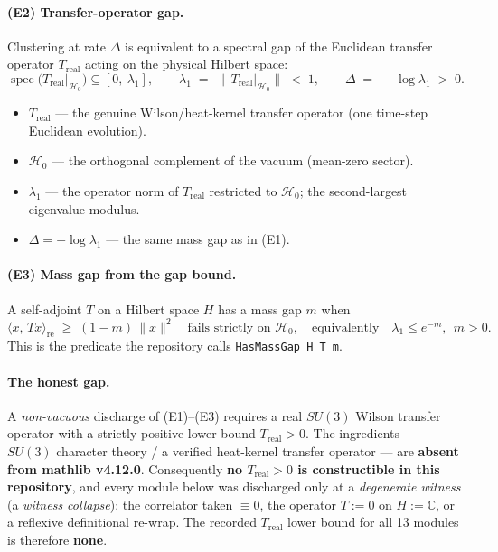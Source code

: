 \documentclass[11pt]{article}
\begin{document}
\paragraph{(E2) Transfer-operator gap.}
Clustering at rate $\Delta$ is equivalent to a spectral gap of the Euclidean
transfer operator $T_{\mathrm{real}}$ acting on the physical Hilbert space:
\[
\operatorname{spec}\!\bigl(T_{\mathrm{real}}\big|_{\mathcal H_0}\bigr)\subseteq[0,\ \lambda_1],
\qquad
\lambda_1 \;=\; \bigl\|\,T_{\mathrm{real}}\big|_{\mathcal H_0}\bigr\| \;<\; 1,
\qquad
\Delta \;=\; -\log\lambda_1 \;>\;0 .
\]
\begin{itemize}
  \item $T_{\mathrm{real}}$ --- the genuine Wilson/heat-kernel transfer operator
        (one time-step Euclidean evolution).
  \item $\mathcal H_0$ --- the orthogonal complement of the vacuum (mean-zero
        sector).
  \item $\lambda_1$ --- the operator norm of $T_{\mathrm{real}}$ restricted to
        $\mathcal H_0$; the second-largest eigenvalue modulus.
  \item $\Delta=-\log\lambda_1$ --- the same mass gap as in (E1).
\end{itemize}

\paragraph{(E3) Mass gap from the gap bound.}
A self-adjoint $T$ on a Hilbert space $H$ has a mass gap $m$ when
\[
\langle x,\,T x\rangle_{\mathrm{re}} \;\ge\; (1-m)\,\|x\|^2
\quad\text{fails strictly on }\mathcal H_0,
\quad\text{equivalently}\quad
\lambda_1 \le e^{-m},\ \ m>0 .
\]
This is the predicate the repository calls \texttt{HasMassGap H T m}.

\paragraph{The honest gap.}
A \emph{non-vacuous} discharge of (E1)--(E3) requires a real $SU(3)$ Wilson
transfer operator with a strictly positive lower bound $T_{\mathrm{real}}>0$.
The ingredients --- $SU(3)$ character theory / a verified heat-kernel transfer
operator --- are \textbf{absent from mathlib v4.12.0}. Consequently
\textbf{no $T_{\mathrm{real}}>0$ is constructible in this repository}, and every
module below was discharged only at a \emph{degenerate witness} (a
\emph{witness collapse}): the correlator taken $\equiv 0$, the operator
$T:=0$ on $H:=\mathbb{C}$, or a reflexive definitional re-wrap. The recorded
$T_{\mathrm{real}}$ lower bound for all 13 modules is therefore \textbf{none}.
\clearpage
\end{document}
